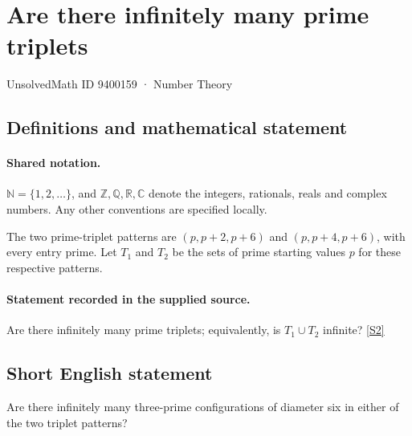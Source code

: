\documentclass[11pt]{article}
\newcommand{\sref}[2]{\hyperlink{source:#1:#2}{[S#2]}}
\begin{document}
\setcounter{section}{9400158}
\section{Are there infinitely many prime triplets}\label{9400159}
{\small\sffamily UnsolvedMath ID 9400159 · Number Theory}
\subsection{Definitions and mathematical statement}

\paragraph{Shared notation.}$\mathbb N=\{1,2,\ldots\}$, and $\mathbb Z,\mathbb Q,\mathbb R,\mathbb C$ denote the integers, rationals, reals and complex numbers. Any other conventions are specified locally.


The two prime-triplet patterns are $(p,p+2,p+6)$ and $(p,p+4,p+6)$, with every entry prime. Let $T_1$ and $T_2$ be the sets of prime starting values $p$ for these respective patterns.
\paragraph{Statement recorded in the supplied source.}
Are there infinitely many prime triplets; equivalently, is $T_1\cup T_2$ infinite? \sref{9400159}{2}
\subsection{Short English statement}
Are there infinitely many three-prime configurations of diameter six in either of the two triplet patterns?
\end{document}
